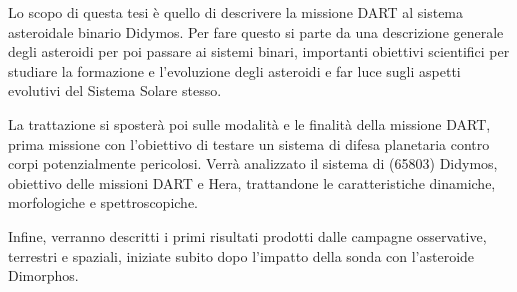 \documentclass[a4paper,11pt,openright]{book}
\newenvironment{abstract}%
{\cleardoublepage%
\thispagestyle{empty}%
\null \vfill
\begin{center}%
\Huge \bfseries \abstractname 
\end{center}}%
{\vfill\null}
\begin{document}
\begin{frontespizio}

    
    
    
    
    
    
    {}
    
    
    
    
    
    
    
   
    
\end{frontespizio}



\frontmatter




\begin{abstract}    
Lo scopo di questa tesi è quello di descrivere la missione DART al sistema asteroidale binario Didymos. Per fare questo si parte da una descrizione generale degli asteroidi per poi passare ai sistemi binari, importanti obiettivi scientifici per studiare la formazione e l'evoluzione degli asteroidi e far luce sugli aspetti evolutivi del Sistema Solare stesso.

La trattazione si sposterà poi sulle modalità e le finalità della missione DART, prima missione con l'obiettivo di testare un sistema di difesa planetaria contro corpi potenzialmente pericolosi. Verrà analizzato il sistema di (65803) Didymos, obiettivo delle missioni DART e Hera, trattandone le caratteristiche dinamiche, morfologiche e spettroscopiche.

Infine, verranno descritti i primi risultati prodotti dalle campagne osservative, terrestri e spaziali, iniziate subito dopo l'impatto della sonda con l'asteroide Dimorphos.



\end{abstract}
\end{document}
